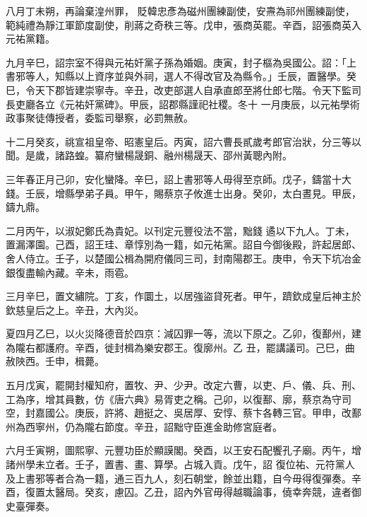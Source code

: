 \begin{pinyinscope}
 八月丁未朔，再論棄湟州罪，
 貶韓忠彥為磁州團練副使，安燾為祁州團練副使，範純禮為靜江軍節度副使，削蔣之奇秩三等。戊申，張商英罷。辛酉，詔張商英入元祐黨籍。



 九月辛巳，詔宗室不得與元祐奸黨子孫為婚姻。庚寅，封子樞為吳國公。詔：「上書邪等人，知縣以上資序並與外祠，選人不得改官及為縣令。」壬辰，置醫學。癸巳，令天下郡皆建崇寧寺。辛丑，改吏部選人自承直郎至將仕郎七階。令天下監司長吏廳各立《元祐奸黨碑》。甲辰，詔郡縣謹祀社稷。冬十
 一月庚辰，以元祐學術政事聚徒傳授者，委監司舉察，必罰無赦。



 十二月癸亥，祧宣祖皇帝、昭憲皇后。丙寅，詔六曹長貳歲考郎官治狀，分三等以聞。是歲，諸路蝗。纂府蠻楊晟銅、融州楊晟天、邵州黃聰內附。



 三年春正月己卯，安化蠻降。辛巳，詔上書邪等人毋得至京師。戊子，鑄當十大錢。壬辰，增縣學弟子員。甲午，賜蔡京子攸進士出身。癸卯，太白晝見。甲辰，鑄九鼎。



 二月丙午，以淑妃鄭氏為貴妃。以刊定元豐役法不當，黜錢
 遹以下九人。丁未，置漏澤園。己酉，詔王珪、章惇別為一籍，如元祐黨。詔自今御後殿，許起居郎、舍人侍立。壬子，以楚國公楫為開府儀同三司，封南陽郡王。庚申，令天下坑冶金銀復盡輸內藏。辛未，雨雹。



 三月辛巳，置文繡院。丁亥，作圜土，以居強盜貸死者。甲午，躋欽成皇后神主於欽慈皇后之上。辛丑，大內災。



 夏四月乙巳，以火災降德音於四京：減囚罪一等，流以下原之。乙卯，復鄯州，建為隴右都護府。辛酉，徙封楫為樂安郡王。復廓州。乙
 丑，罷講議司。己巳，曲赦陜西。壬申，楫薨。



 五月戊寅，罷開封權知府，置牧、尹、少尹。改定六曹，以吏、戶、儀、兵、刑、工為序，增其員數，仿《唐六典》易胥吏之稱。己卯，以復鄯、廓，蔡京為守司空，封嘉國公。庚辰，許將、趙挺之、吳居厚、安惇、蔡卞各轉三官。甲申，改鄯州為西寧州，仍為隴右節度。辛丑，詔黜守臣進金助修宮庭者。



 六月壬寅朔，圖熙寧、元豐功臣於顯謨閣。癸酉，以王安石配饗孔子廟。丙午，增諸州學未立者。壬子，置書、畫、算學。占城入貢。戊午，詔
 復位祐、元符黨人及上書邪等者合為一籍，通三百九人，刻石朝堂，餘並出籍，自今毋得復彈奏。辛酉，復置太醫局。癸亥，慮囚。乙丑，詔內外官毋得越職論事，僥幸奔競，違者御史臺彈奏。




\end{pinyinscope}
